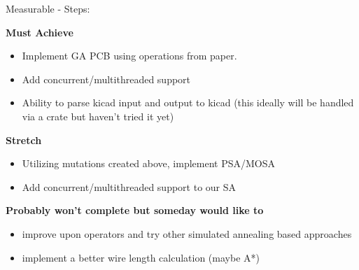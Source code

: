 \documentclass{article}
\begin{document}
\noindent Measurable - Steps: 

\noindent\textbf{Must Achieve}
\begin{itemize}

    \item Implement GA PCB using operations from paper. 
    \item Add concurrent/multithreaded support
    \item Ability to parse kicad input and output to kicad (this ideally will be handled via a crate but haven't tried it yet)
\end{itemize}


\noindent\textbf{Stretch}
\begin{itemize}
    \item Utilizing mutations created above, implement PSA/MOSA 
    \item Add concurrent/multithreaded support to our SA 
\end{itemize}

\noindent\textbf{Probably won't complete but someday would like to}
\begin{itemize}
    \item improve upon operators and try other simulated annealing based approaches
    \item implement a better wire length calculation (maybe A*)
\end{itemize}
\end{document}
